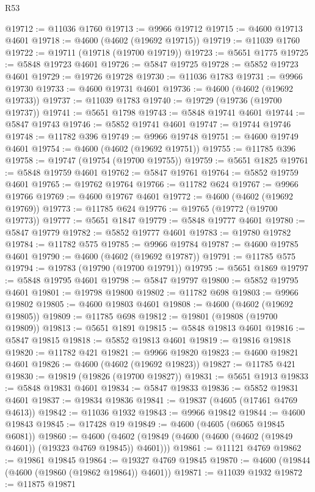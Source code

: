 \begin{lexlean}{R53}
\begin{coremodule}
@19712 := @11036 @1760
@19713 := @9966 @19712
@19715 := @4600 @19713 @4601
@19718 := @4600 (@4602 (@19692 @19715))
@19719 := @11039 @1760
@19722 := @19711 (@19718 (@19700 @19719))
@19723 := @5651 @1775
@19725 := @5848 @19723 @4601
@19726 := @5847 @19725
@19728 := @5852 @19723 @4601
@19729 := @19726 @19728
@19730 := @11036 @1783
@19731 := @9966 @19730
@19733 := @4600 @19731 @4601
@19736 := @4600 (@4602 (@19692 @19733))
@19737 := @11039 @1783
@19740 := @19729 (@19736 (@19700 @19737))
@19741 := @5651 @1798
@19743 := @5848 @19741 @4601
@19744 := @5847 @19743
@19746 := @5852 @19741 @4601
@19747 := @19744 @19746
@19748 := @11782 @396
@19749 := @9966 @19748
@19751 := @4600 @19749 @4601
@19754 := @4600 (@4602 (@19692 @19751))
@19755 := @11785 @396
@19758 := @19747 (@19754 (@19700 @19755))
@19759 := @5651 @1825
@19761 := @5848 @19759 @4601
@19762 := @5847 @19761
@19764 := @5852 @19759 @4601
@19765 := @19762 @19764
@19766 := @11782 @624
@19767 := @9966 @19766
@19769 := @4600 @19767 @4601
@19772 := @4600 (@4602 (@19692 @19769))
@19773 := @11785 @624
@19776 := @19765 (@19772 (@19700 @19773))
@19777 := @5651 @1847
@19779 := @5848 @19777 @4601
@19780 := @5847 @19779
@19782 := @5852 @19777 @4601
@19783 := @19780 @19782
@19784 := @11782 @575
@19785 := @9966 @19784
@19787 := @4600 @19785 @4601
@19790 := @4600 (@4602 (@19692 @19787))
@19791 := @11785 @575
@19794 := @19783 (@19790 (@19700 @19791))
@19795 := @5651 @1869
@19797 := @5848 @19795 @4601
@19798 := @5847 @19797
@19800 := @5852 @19795 @4601
@19801 := @19798 @19800
@19802 := @11782 @698
@19803 := @9966 @19802
@19805 := @4600 @19803 @4601
@19808 := @4600 (@4602 (@19692 @19805))
@19809 := @11785 @698
@19812 := @19801 (@19808 (@19700 @19809))
@19813 := @5651 @1891
@19815 := @5848 @19813 @4601
@19816 := @5847 @19815
@19818 := @5852 @19813 @4601
@19819 := @19816 @19818
@19820 := @11782 @421
@19821 := @9966 @19820
@19823 := @4600 @19821 @4601
@19826 := @4600 (@4602 (@19692 @19823))
@19827 := @11785 @421
@19830 := @19819 (@19826 (@19700 @19827))
@19831 := @5651 @1913
@19833 := @5848 @19831 @4601
@19834 := @5847 @19833
@19836 := @5852 @19831 @4601
@19837 := @19834 @19836
@19841 := @19837 (@4605 (@17461 @4769 @4613))
@19842 := @11036 @1932
@19843 := @9966 @19842
@19844 := @4600 @19843
@19845 := @17428 @19
@19849 := @4600 (@4605 (@6065 @19845 @6081))
@19860 := @4600 (@4602 (@19849 (@4600 (@4600 (@4602 (@19849 @4601)) (@19323 @4769 @19845)) @4601)))
@19861 := @11121 @4769
@19862 := @19861 @19845
@19864 := @19327 @4769 @19845
@19870 := @4600 (@19844 (@4600 (@19860 (@19862 @19864)) @4601))
@19871 := @11039 @1932
@19872 := @11875 @19871

\end{coremodule}
\end{lexlean}
